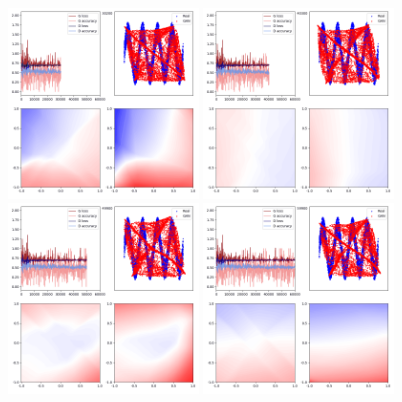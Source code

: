 \documentclass[lang=cn,11pt]{elegantpaper}
\begin{document}
\begin{figure}[hbt]
\centering
  \includegraphics[width=0.45\textwidth]{sin_6_1}
  \includegraphics[width=0.45\textwidth]{sin_6_2}\\
  \includegraphics[width=0.45\textwidth]{sin_6_3}
  \includegraphics[width=0.45\textwidth]{sin_6_4}
  \caption{}
\end{figure}
\end{document}
